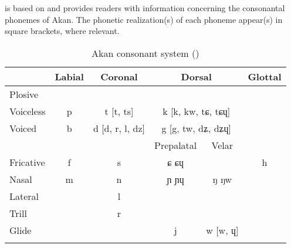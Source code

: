 \documentclass[output=paper,colorlinks,citecolor=brown]{langscibook}
\begin{document}
 is based on \citet[29, 48]{Dolphyne1988} and provides readers with information concerning the consonantal phonemes of Akan. The phonetic realization(s) of each phoneme appear(s) in square brackets, where relevant.%

\begin{table}
\caption{Akan consonant system (\cite[29, 48]{Dolphyne1988})}
\label{tab:AkanConsonants}
\begin{tabular}{l c c c@{~~}c c}
\lsptoprule
 & \multicolumn{1}{c}{Labial} & \multicolumn{1}{c}{Coronal} & \multicolumn{2}{c}{Dorsal} & \multicolumn{1}{c}{Glottal}\\
\midrule
Plosive & \\
\quad Voiceless & p & t [t, ts] & \multicolumn{2}{c}{k [k, kw, tɕ, tɕɥ]} & \multicolumn{1}{c}{} \\ 
\quad Voiced    & b & d [d, r, l, dz] & \multicolumn{2}{c}{g [g, tw, dʑ, dʑɥ]} & \multicolumn{1}{c}{} \\
\midrule
                & & & \multicolumn{1}{c}{Prepalatal} & \multicolumn{1}{c}{Velar} & \multicolumn{1}{c}{} \\
\midrule
Fricative & f & s & ɕ ɕɥ & & h \\
Nasal     & m & n & ɲ ɲɥ &ŋ ŋw &  \\
Lateral   &  & l & & &  \\
Trill     &  & r & & & \\
Glide     &  &  & j &w [w, ɥ] &  \\
\lspbottomrule
\end{tabular}
\end{table}
\end{document}
